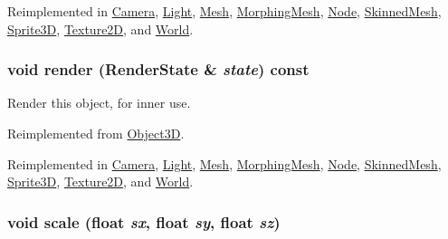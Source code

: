 Reimplemented in \hyperlink{classm3g_1_1Camera_6fea17fa1532df3794f8cb39cb4f911f}{Camera}, \hyperlink{classm3g_1_1Light_6fea17fa1532df3794f8cb39cb4f911f}{Light}, \hyperlink{classm3g_1_1Mesh_6fea17fa1532df3794f8cb39cb4f911f}{Mesh}, \hyperlink{classm3g_1_1MorphingMesh_6fea17fa1532df3794f8cb39cb4f911f}{MorphingMesh}, \hyperlink{classm3g_1_1Node_6fea17fa1532df3794f8cb39cb4f911f}{Node}, \hyperlink{classm3g_1_1SkinnedMesh_6fea17fa1532df3794f8cb39cb4f911f}{SkinnedMesh}, \hyperlink{classm3g_1_1Sprite3D_6fea17fa1532df3794f8cb39cb4f911f}{Sprite3D}, \hyperlink{classm3g_1_1Texture2D_6fea17fa1532df3794f8cb39cb4f911f}{Texture2D}, and \hyperlink{classm3g_1_1World_6fea17fa1532df3794f8cb39cb4f911f}{World}.\hypertarget{classm3g_1_1Transformable_8babc8a79b78615da51161e94029eea9}{
\subsubsection[{render}]{\setlength{\rightskip}{0pt plus 5cm}void render ({\bf RenderState} \& {\em state}) const}}
\label{classm3g_1_1Transformable_8babc8a79b78615da51161e94029eea9}


Render this object, for inner use. 

Reimplemented from \hyperlink{classm3g_1_1Object3D_8babc8a79b78615da51161e94029eea9}{Object3D}.

Reimplemented in \hyperlink{classm3g_1_1Camera_8babc8a79b78615da51161e94029eea9}{Camera}, \hyperlink{classm3g_1_1Light_8babc8a79b78615da51161e94029eea9}{Light}, \hyperlink{classm3g_1_1Mesh_8babc8a79b78615da51161e94029eea9}{Mesh}, \hyperlink{classm3g_1_1MorphingMesh_8babc8a79b78615da51161e94029eea9}{MorphingMesh}, \hyperlink{classm3g_1_1Node_8babc8a79b78615da51161e94029eea9}{Node}, \hyperlink{classm3g_1_1SkinnedMesh_8babc8a79b78615da51161e94029eea9}{SkinnedMesh}, \hyperlink{classm3g_1_1Sprite3D_8babc8a79b78615da51161e94029eea9}{Sprite3D}, \hyperlink{classm3g_1_1Texture2D_8babc8a79b78615da51161e94029eea9}{Texture2D}, and \hyperlink{classm3g_1_1World_8babc8a79b78615da51161e94029eea9}{World}.\hypertarget{classm3g_1_1Transformable_d94deaf828db5e2dfd5e40db42b64cd9}{
\subsubsection[{scale}]{\setlength{\rightskip}{0pt plus 5cm}void scale (float {\em sx}, \/  float {\em sy}, \/  float {\em sz})}}
\label{classm3g_1_1Transformable_d94deaf828db5e2dfd5e40db42b64cd9}


